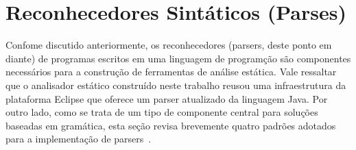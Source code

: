 

\section{Reconhecedores Sintáticos (Parses)}

Confome discutido anteriormente, os reconhecedores (parsers, deste ponto 
em diante) de programas escritos em uma linguagem de programção 
são componentes necessários para a construção de ferramentas de análise 
estática. Vale ressaltar que o analisador estático construído neste trabalho reusou uma infraestrutura 
da plataforma Eclipse que oferece um parser atualizado da linguagem Java. Por outro lado, como 
se trata de um tipo de componente central para soluções baseadas em gramática, esta seção 
revisa brevemente quatro padrões adotados para a implementação de parsers~\cite{Parr:2009:LIP:1823613}.

